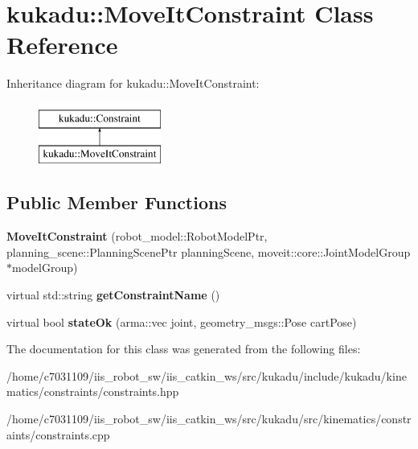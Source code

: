 \hypertarget{classkukadu_1_1MoveItConstraint}{\section{kukadu\-:\-:Move\-It\-Constraint Class Reference}
\label{classkukadu_1_1MoveItConstraint}
}
Inheritance diagram for kukadu\-:\-:Move\-It\-Constraint\-:\begin{figure}[H]
\begin{center}
\leavevmode
\includegraphics[height=2.000000cm]{classkukadu_1_1MoveItConstraint}
\end{center}
\end{figure}
\subsection*{Public Member Functions}
\begin{DoxyCompactItemize}
\item 
\hypertarget{classkukadu_1_1MoveItConstraint_a8c238ba81d91e292334a1f7fc58366d2}{{\bfseries Move\-It\-Constraint} (robot\-\_\-model\-::\-Robot\-Model\-Ptr, planning\-\_\-scene\-::\-Planning\-Scene\-Ptr planning\-Scene, moveit\-::core\-::\-Joint\-Model\-Group $\ast$model\-Group)}\label{classkukadu_1_1MoveItConstraint_a8c238ba81d91e292334a1f7fc58366d2}

\item 
\hypertarget{classkukadu_1_1MoveItConstraint_a9454a3a164f71145b89d8df88dcbab2f}{virtual std\-::string {\bfseries get\-Constraint\-Name} ()}\label{classkukadu_1_1MoveItConstraint_a9454a3a164f71145b89d8df88dcbab2f}

\item 
\hypertarget{classkukadu_1_1MoveItConstraint_a32ad1c00688ae65a244708cac486bb03}{virtual bool {\bfseries state\-Ok} (arma\-::vec joint, geometry\-\_\-msgs\-::\-Pose cart\-Pose)}\label{classkukadu_1_1MoveItConstraint_a32ad1c00688ae65a244708cac486bb03}

\end{DoxyCompactItemize}


The documentation for this class was generated from the following files\-:\begin{DoxyCompactItemize}
\item 
/home/c7031109/iis\-\_\-robot\-\_\-sw/iis\-\_\-catkin\-\_\-ws/src/kukadu/include/kukadu/kinematics/constraints/constraints.\-hpp\item 
/home/c7031109/iis\-\_\-robot\-\_\-sw/iis\-\_\-catkin\-\_\-ws/src/kukadu/src/kinematics/constraints/constraints.\-cpp\end{DoxyCompactItemize}
